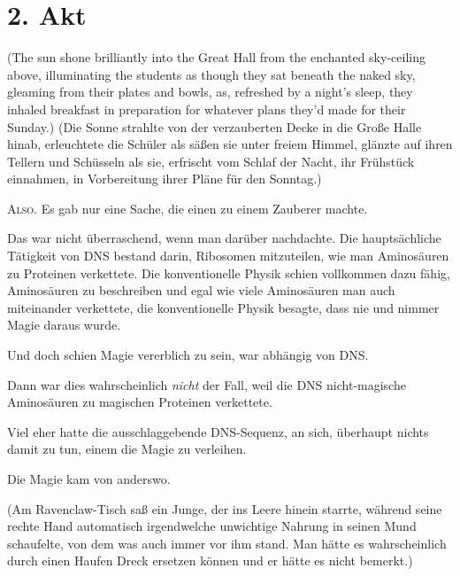 \section{2. Akt}
(The sun shone brilliantly into the Great Hall from the enchanted sky-ceiling above, illuminating the students as though they sat beneath the naked sky, gleaming from their plates and bowls, as, refreshed by a night’s sleep, they inhaled breakfast in preparation for whatever plans they’d made for their Sunday.)
(Die Sonne strahlte von der verzauberten Decke in die Große Halle hinab, erleuchtete die Schüler als säßen sie unter freiem Himmel, glänzte auf ihren Tellern und Schüsseln als sie, erfrischt vom Schlaf der Nacht, ihr Frühstück einnahmen, in Vorbereitung ihrer Pläne für den Sonntag.)

\lettrine{A}{lso.} Es gab nur eine Sache, die einen zu einem Zauberer machte.

Das war nicht überraschend, wenn man darüber nachdachte. Die hauptsächliche Tätigkeit von DNS bestand darin, Ribosomen mitzuteilen, wie man Aminosäuren zu Proteinen verkettete. Die konventionelle Physik schien vollkommen dazu fähig, Aminosäuren zu beschreiben und egal wie viele Aminosäuren man auch miteinander verkettete, die konventionelle Physik besagte, dass nie und nimmer Magie daraus wurde.

Und doch schien Magie vererblich zu sein, war abhängig von DNS.

Dann war dies wahrscheinlich \emph{nicht} der Fall, weil die DNS nicht-magische Aminosäuren zu magischen Proteinen verkettete.

Viel eher hatte die ausschlaggebende DNS-Sequenz, an sich, überhaupt nichts damit zu tun, einem die Magie zu verleihen.

Die Magie kam von anderswo.

(Am Ravenclaw-Tisch saß ein Junge, der ins Leere hinein starrte, während seine rechte Hand automatisch irgendwelche unwichtige Nahrung in seinen Mund schaufelte, von dem was auch immer vor ihm stand. Man hätte es wahrscheinlich durch einen Haufen Dreck ersetzen können und er hätte es nicht bemerkt.)

